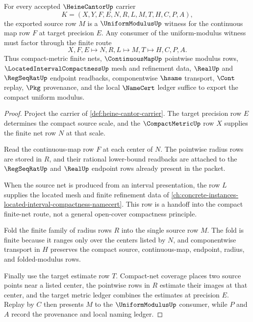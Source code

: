 \begin{theorem}
\label{thm:heine-cantor-compact-uniform-modulus}
For every accepted $\HeineCantorUp$ carrier
$$
K=(X,Y,F,E,N,R,L,M,T,H,C,P,A),
$$
the exported source row $M$ is a $\UniformModulusUp$ witness for the continuous map row $F$ at target precision $E$. Any consumer of the uniform-modulus witness must factor through the finite route
$$
X,F,E \longmapsto N,R,L \longmapsto M,T \longmapsto H,C,P,A.
$$
Thus compact-metric finite nets, $\ContinuousMapUp$ pointwise modulus rows, $\LocatedIntervalCompactnessUp$ mesh and refinement data, $\RealUp$ and $\RegSeqRatUp$ endpoint readbacks, componentwise $\hsame$ transport, $\Cont$ replay, $\Pkg$ provenance, and the local $\NameCert$ ledger suffice to export the compact uniform modulus.
\end{theorem}
\begin{proof}
Project the carrier of \autoref{def:heine-cantor-carrier}. The target precision row $E$ determines the compact source scale, and the $\CompactMetricUp$ row $X$ supplies the finite net row $N$ at that scale.

Read the continuous-map row $F$ at each center of $N$. The pointwise radius rows are stored in $R$, and their rational lower-bound readbacks are attached to the $\RegSeqRatUp$ and $\RealUp$ endpoint rows already present in the packet.

When the source net is produced from an interval presentation, the row $L$ supplies the located mesh and finite refinement data of \autoref{ch:concrete-instances-located-interval-compactness-namecert}. This row is a handoff into the compact finite-net route, not a general open-cover compactness principle.

Fold the finite family of radius rows $R$ into the single source row $M$. The fold is finite because it ranges only over the centers listed by $N$, and componentwise transport in $H$ preserves the compact source, continuous-map, endpoint, radius, and folded-modulus rows.

Finally use the target estimate row $T$. Compact-net coverage places two source points near a listed center, the pointwise rows in $R$ estimate their images at that center, and the target metric ledger combines the estimates at precision $E$. Replay by $C$ then presents $M$ to the $\UniformModulusUp$ consumer, while $P$ and $A$ record the provenance and local naming ledger.
\end{proof}

